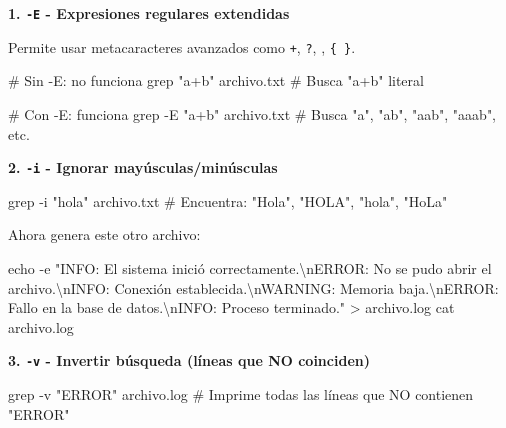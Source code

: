 \documentclass[
  spanish,
  12pt,
  letterpaper,
  DIV=11,
  numbers=noendperiod]{scrreprt}
\newenvironment{Shaded}{\begin{snugshade}}{\end{snugshade}}
\newcommand{\AttributeTok}[1]{\textcolor[rgb]{0.40,0.45,0.13}{#1}}
\newcommand{\BuiltInTok}[1]{\textcolor[rgb]{0.00,0.23,0.31}{#1}}
\newcommand{\CommentTok}[1]{\textcolor[rgb]{0.37,0.37,0.37}{#1}}
\newcommand{\FunctionTok}[1]{\textcolor[rgb]{0.28,0.35,0.67}{#1}}
\newcommand{\NormalTok}[1]{\textcolor[rgb]{0.00,0.23,0.31}{#1}}
\newcommand{\OperatorTok}[1]{\textcolor[rgb]{0.37,0.37,0.37}{#1}}
\newcommand{\StringTok}[1]{\textcolor[rgb]{0.13,0.47,0.30}{#1}}
\begin{document}
\textbf{1. \texttt{-E} - Expresiones regulares extendidas}

Permite usar metacaracteres avanzados como \texttt{+}, \texttt{?},
\texttt{\textbar{}}, \texttt{\{\ \}}.

\begin{Shaded}
\begin{Highlighting}[]
\CommentTok{\# Sin {-}E: no funciona}
\FunctionTok{grep} \StringTok{"a+b"}\NormalTok{ archivo.txt      }\CommentTok{\# Busca "a+b" literal}

\CommentTok{\# Con {-}E: funciona}
\FunctionTok{grep} \AttributeTok{{-}E} \StringTok{"a+b"}\NormalTok{ archivo.txt   }\CommentTok{\# Busca "a", "ab", "aab", "aaab", etc.}
\end{Highlighting}
\end{Shaded}

\textbf{2. \texttt{-i} - Ignorar mayúsculas/minúsculas}

\begin{Shaded}
\begin{Highlighting}[]
\FunctionTok{grep} \AttributeTok{{-}i} \StringTok{"hola"}\NormalTok{ archivo.txt}
\CommentTok{\# Encuentra: "Hola", "HOLA", "hola", "HoLa"}
\end{Highlighting}
\end{Shaded}

Ahora genera este otro archivo:

\begin{Shaded}
\begin{Highlighting}[]
\BuiltInTok{echo} \AttributeTok{{-}e} \StringTok{"INFO: El sistema inició correctamente.\textbackslash{}nERROR: No se pudo abrir el archivo.\textbackslash{}nINFO: Conexión establecida.\textbackslash{}nWARNING: Memoria baja.\textbackslash{}nERROR: Fallo en la base de datos.\textbackslash{}nINFO: Proceso terminado."} \OperatorTok{\textgreater{}}\NormalTok{ archivo.log}
\FunctionTok{cat}\NormalTok{ archivo.log}
\end{Highlighting}
\end{Shaded}

\textbf{3. \texttt{-v} - Invertir búsqueda (líneas que NO coinciden)}

\begin{Shaded}
\begin{Highlighting}[]
\FunctionTok{grep} \AttributeTok{{-}v} \StringTok{"ERROR"}\NormalTok{ archivo.log}
\CommentTok{\# Imprime todas las líneas que NO contienen "ERROR"}
\end{Highlighting}
\end{Shaded}
\end{document}
